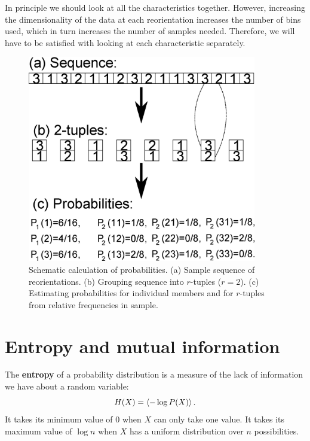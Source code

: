 \documentclass[12pt]{article}
\begin{document}
In principle we should look at all the characteristics together. However, increasing the dimensionality of the data at each reorientation increases the number of bins used, which in turn increases the number of samples needed. Therefore, we will have to be satisfied with looking at each characteristic separately.

\begin{figure}
  \begin{center}
    \includegraphics[width=10cm]{schematic.eps}
  \end{center}
  \caption{Schematic calculation of probabilities. (a) Sample sequence of reorientations. (b) Grouping sequence into $r$-tuples ($r=2$). (c) Estimating probabilities for individual members and for $r$-tuples from relative frequencies in sample.} \label{fig:schematic}
\end{figure}



\section{Entropy and mutual information}\label{sec:entropy}

The \textbf{entropy} of a probability distribution is a measure of the lack of information we have about a random variable:
%
\begin{equation}\label{eq:ent}
  H(X) = \left\langle -\log P(X) \right\rangle.
\end{equation}
%
It takes its minimum value of $0$ when $X$ can only take one value. It takes its maximum value of $\log n$ when $X$ has a uniform distribution over $n$ possibilities.
\end{document}
